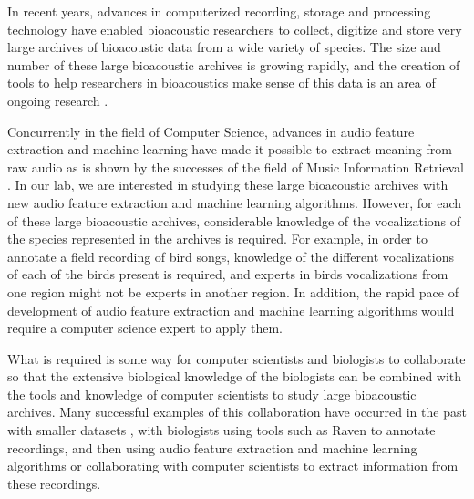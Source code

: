 
\label{chap:introduction}

In recent years, advances in computerized recording, storage and
processing technology have enabled bioacoustic researchers to collect,
digitize and store very large archives of bioacoustic data from a wide
variety of species. The size and number of these large bioacoustic
archives is growing rapidly, and the creation of tools to help
researchers in bioacoustics make sense of this data is an area of
ongoing research \cite{halkias2013icml4b}.

Concurrently in the field of Computer Science, advances in audio
feature extraction and machine learning have made it possible to
extract meaning from raw audio as is shown by the successes of the
field of Music Information Retrieval \cite{tzanetakis2008marsyas}.  In
our lab, we are interested in studying these large bioacoustic
archives with new audio feature extraction and machine learning
algorithms.  However, for each of these large bioacoustic archives,
considerable knowledge of the vocalizations of the species represented
in the archives is required.  For example, in order to annotate a
field recording of bird songs, knowledge of the different
vocalizations of each of the birds present is required, and experts in
birds vocalizations from one region might not be experts in another
region.  In addition, the rapid pace of development of audio feature
extraction and machine learning algorithms would require a computer
science expert to apply them.

What is required is some way for computer scientists and biologists to
collaborate so that the extensive biological knowledge of the
biologists can be combined with the tools and knowledge of computer
scientists to study large bioacoustic archives.  Many successful
examples of this collaboration have occurred in the past with smaller
datasets \cite{yurkphd}, with biologists using tools such as Raven
\cite{cornell2011raven} to annotate recordings, and then using audio
feature extraction and machine learning algorithms
\cite{deecke1999quantifying} or collaborating with computer scientists
to extract information from these recordings.


